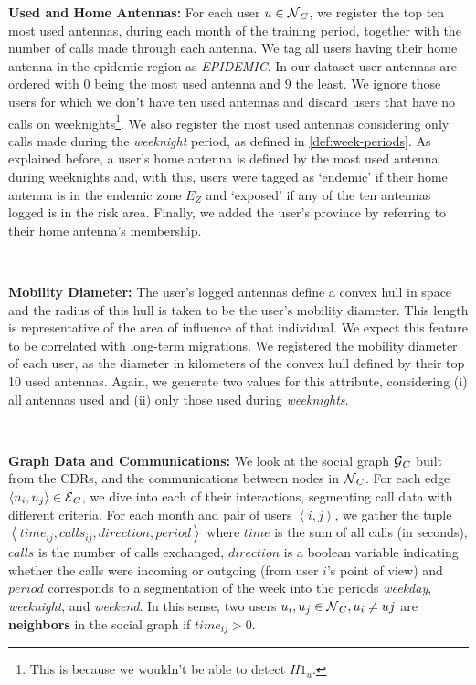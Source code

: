 \begin{enumerate*}[label={\alph*)},]
\item \textbf{Used and Home Antennas:} For each user $u \in \operatorname{\mathcal{N}}_C$, we register the top ten most used antennas, during each month of the training period,
together with the number of calls made through each antenna.
We tag all users having their home antenna in the epidemic region as \textit{EPIDEMIC}.
In our dataset user antennas are ordered with $0$ being the most used antenna and $9$ the least.
We ignore those users for which we don't have ten used antennas and discard users that have no calls on weeknights\footnote{This is because we wouldn't be able to detect $H1_u$.}.
We also register the most used antennas considering only calls made during the \textit{weeknight} period, as defined in \cref{def:week-periods}.
As explained before, a user's home antenna is defined by the most used antenna during weeknights and, with this, users were tagged as `endemic' if their home antenna is in the endemic zone $E_Z$ and `exposed' if any of the ten antennas logged is in the risk area.
Finally, we added the user's province by referring to their home antenna's membership.

\\

\item \textbf{Mobility Diameter:} The user's logged antennas define a convex hull in space and the radius of this hull is taken to be the user's mobility diameter.
This length is representative of the area of influence of that individual.
We expect this feature to be correlated with long-term migrations.
We registered the mobility diameter of each user, as the diameter in kilometers of the convex hull defined by their top 10 used antennas.
Again, we generate two values for this attribute, considering (i) all antennas used and (ii) only those used during \textit{weeknights}.

\\

\item \textbf{Graph Data and Communications:} We look at the social graph $\operatorname{\mathcal{G}}_C$ built from the CDRs, and the communications between nodes in $\operatorname{\mathcal{N}}_C$.
For each edge $\left< n_i, n_j \right> \in \operatorname{\mathcal{E}}_C$, we dive into each of their interactions, segmenting call data with different criteria.
For each month and pair of users $\left< i,j \right>$, we gather the tuple $\left< time_{ij}, calls_{ij}, direction, period \right>$ where $time$ is the sum of all calls (in seconds), $calls$ is the number of calls exchanged, $direction$ is a boolean variable indicating whether the calls were incoming or outgoing (from user $i$'s point of view) and $period$ corresponds to a segmentation of the week into the periods \textit{weekday}, \textit{weeknight}, and \textit{weekend}.
In this sense, two users $u_i, u_j \in \operatorname{\mathcal{N}}_C, u_i \neq uj$ are \textbf{neighbors} in the social graph if $time_{ij} > 0$.
\end{enumerate*}


